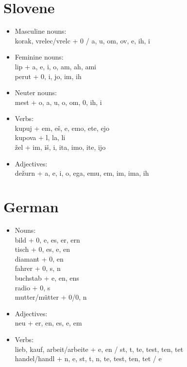 \section{Slovene}
\begin{flushleft}
\begin{itemize}
\item Masculine nouns:\\
korak, vrelec/vrelc + 0 / a, u, om, ov, e, ih, i

\item Feminine nouns:\\
lip + a, e, i, o, am, ah, ami\\
perut + 0, i, jo, im, ih\\

\item Neuter nouns:\\
mest + o, a, u, o, om, 0, ih, i \\

\item Verbs:\\
kupuj + em, eš, e, emo, ete, ejo\\
kupova + l, la, li\\
žel + im, iš, i, ita, imo, ite, ijo\\

\item Adjectives:\\
dežurn + a, e, i, o, ega, emu, em, im, ima, ih\\
\end{itemize}
\end{flushleft}

\section{German}
\begin{flushleft}
\begin{itemize}
\item Nouns:\\
bild + 0, e, es, er, ern\\
tisch + 0, es, e, en\\
diamant + 0, en\\
fahrer + 0, s, n\\
buchstab + e, en, ens\\
radio + 0, s\\
mutter/mütter + 0/0, n\\

\item Adjectives:\\
neu + er, en, es, e, em\\

\item Verbs:\\
lieb, kauf, arbeit/arbeite + e, en / st, t, te, test, ten, tet\\
handel/handl + n, e, st, t, n, te, test, ten, tet / e\\
\end{itemize}
\end{flushleft}


